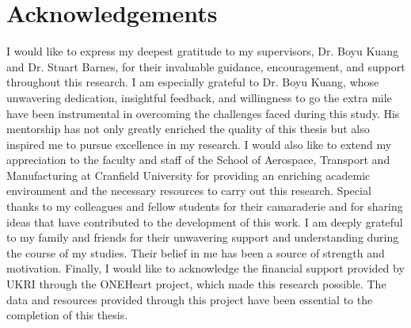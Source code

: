 \documentclass[12pt,oneside]{book} %
\begin{document}
\chapter{Acknowledgements}
I would like to express my deepest gratitude to my supervisors, Dr. Boyu Kuang
and Dr. Stuart Barnes, for their invaluable guidance, encouragement, and
support throughout this research. I am especially grateful to Dr. Boyu Kuang,
whose unwavering dedication, insightful feedback, and willingness to go the
extra mile have been instrumental in overcoming the challenges faced during
this study. His mentorship has not only greatly enriched the quality of this
thesis but also inspired me to pursue excellence in my research. I would also
like to extend my appreciation to the faculty and staff of the School of
Aerospace, Transport and Manufacturing at Cranfield University for providing an
enriching academic environment and the necessary resources to carry out this
research. Special thanks to my colleagues and fellow students for their
camaraderie and for sharing ideas that have contributed to the development of
this work. I am deeply grateful to my family and friends for their unwavering
support and understanding during the course of my studies. Their belief in me
has been a source of strength and motivation. Finally, I would like to
acknowledge the financial support provided by UKRI through the ONEHeart
project, which made this research possible. The data and resources provided
through this project have been essential to the completion of this thesis. {
        \clearpage

        \singlespacing{
            \tableofcontents
        }
        \clearpage

        {%
            \let\oldnumberline\numberline%
            \renewcommand{\numberline}{\figurename~\oldnumberline}%
            \listoffigures%
        }

        \clearpage
        {%
            \let\oldnumberline\numberline%
            \renewcommand{\numberline}{\tablename~\oldnumberline}%
            \listoftables%
        }
    }
\end{document}
